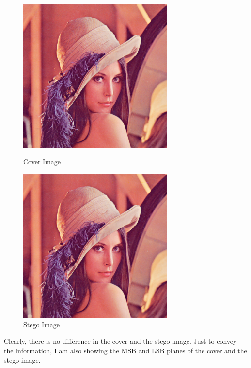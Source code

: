 \documentclass{report}
\begin{document}
\begin{figure}[H]
\centering
\begin{minipage}{0.46\linewidth}
\centering
\includegraphics[width=0.7\textwidth]{images/lenna.png}
\caption{Cover Image}
\end{minipage}
\hfill
\begin{minipage}{0.46\linewidth}
\centering
\includegraphics[width=0.7\textwidth]{images/stego-lenna.png}
\caption{Stego Image}
\end{minipage}
\end{figure}
Clearly, there is no difference in the cover and the stego image. Just to convey the information, I am also showing the MSB and LSB planes of the cover and the stego-image.
\end{document}
